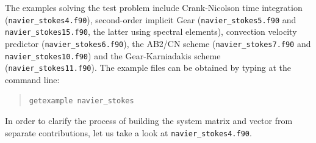 The examples solving the test problem include Crank-Nicolson time
integration (\texttt{navier\_stokes4.f90}), second-order implicit Gear
(\texttt{navier\_stokes5.f90} and \texttt{navier\_stokes15.f90}, the latter
using spectral elements),
convection velocity predictor (\texttt{navier\_stokes6.f90}), the AB2/CN
scheme (\texttt{navier\_stokes7.f90} and \texttt{navier\_stokes10.f90}) and
the Gear-Karniadakis scheme  
(\texttt{navier\_stokes11.f90}).
The example files can be obtained by typing at the
command line:
\begin{quote}
   \texttt{getexample navier\_stokes}
\end{quote}

In order to clarify the process of building the system matrix and vector from separate contributions,
let us take a look at \texttt{navier\_stokes4.f90}.

